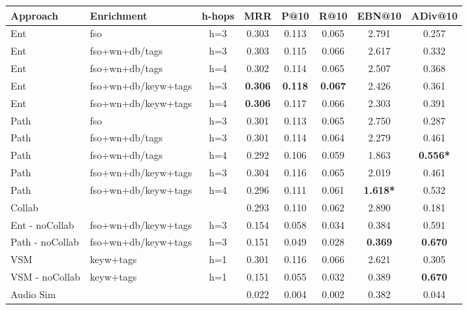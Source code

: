 \begin{table}
	\label{tbl:graph-rec:Res1}
\begin{tabular}{l l c c c c c c }
		\toprule
		\textbf{Approach} & \textbf{Enrichment} & \textbf{h-hops} & \textbf{MRR} &  \textbf{P@10} & \textbf{R@10} & \textbf{EBN@10}  & \textbf{ADiv@10}\\
		\midrule
		Ent & fso & h=3 & 0.303 & 0.113  &  0.065 & 2.791	& 0.257   \\
		Ent & fso+wn+db/tags & h=3 & 0.303 & 0.115  &  0.066  & 2.617 &	0.332  \\
		Ent & fso+wn+db/tags & h=4 & 0.302 & 0.114  & 0.065  & 2.507 & 0.368  \\
		Ent & fso+wn+db/keyw+tags & h=3 & \textbf{0.306 }& \textbf{0.118}  &  \textbf{0.067}  & 2.426 &	0.361  \\
		Ent & fso+wn+db/keyw+tags & h=4 & \textbf{0.306}  & 0.117 & 0.066  &2.303  & 0.391   \\ 
		Path & fso & h=3 &  0.301 &  0.113  &  0.065   & 2.750 & 0.287   \\
		Path & fso+wn+db/tags & h=3 & 0.301 &  0.114 &  0.064 & 2.279 	& 0.461   \\
		Path & fso+wn+db/tags & h=4 &   0.292 & 0.106 & 0.059   & 1.863 & \textbf{0.556*}   \\
		Path & fso+wn+db/keyw+tags & h=3 &  0.304 & 0.116 &  0.065    & 2.019 &	0.461     \\
		Path & fso+wn+db/keyw+tags & h=4 & 0.296 & 0.111 &	0.061      & \textbf{1.618*}	& 0.532   \\
		\midrule
		Collab & & & 0.293 & 0.110 & 0.062 &	2.890 &	0.181 \\	
		Ent - noCollab & fso+wn+db/keyw+tags & h=3 & 0.154   & 0.058	 &0.034	  & 0.384	& 0.591   \\		
		Path - noCollab & fso+wn+db/keyw+tags & h=3 & 0.151 & 0.049 & 0.028  & \textbf{0.369} & \textbf{0.670}   \\			
		VSM & keyw+tags & h=1 & 0.301 &   0.116 &  0.066  & 2.621 &	0.305 \\
		VSM - noCollab & keyw+tags & h=1 & 0.151  & 0.055 	 & 0.032	& 0.389 & \textbf{0.670} \\
		Audio Sim & & & 0.022 & 0.004 & 0.002 &	0.382	&	0.044 \\
		\bottomrule
	\end{tabular}
	

\end{table}
